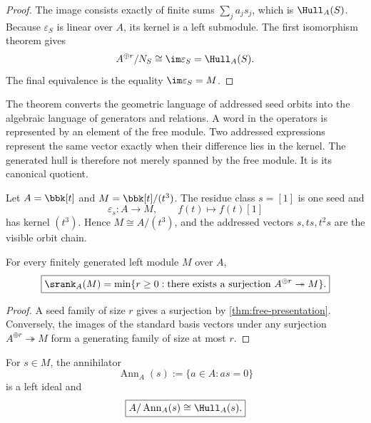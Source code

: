 \begin{proof}
The image consists exactly of finite sums $\sum_ja_js_j$, which is $\Hull_A(S)$.  Because $\varepsilon_S$ is linear over $A$, its kernel is a left submodule.  The first isomorphism theorem gives
\[
A^{\oplus r}/N_S\cong\im\varepsilon_S=\Hull_A(S).
\]
The final equivalence is the equality $\im\varepsilon_S=M$.
\end{proof}

\begin{interpretation}
The theorem converts the geometric language of addressed seed orbits into the algebraic language of generators and relations.  A word in the operators is represented by an element of the free module.  Two addressed expressions represent the same vector exactly when their difference lies in the kernel.  The generated hull is therefore not merely spanned by the free module.  It is its canonical quotient.
\end{interpretation}

\begin{microexample}[title={A cyclic nilpotent chain}]
Let \(A=\bbk[t]\) and \(M=\bbk[t]/(t^3)\).  The residue class \(s=[1]\) is one seed and
\[
\varepsilon_s:A\to M,
\qquad
f(t)\mapsto f(t)[1]
\]
has kernel \((t^3)\).  Hence \(M\cong A/(t^3)\), and the addressed vectors \(s,ts,t^2s\) are the visible orbit chain.
\end{microexample}


\begin{corollary}
\label{cor:minimal-free-cover}
For every finitely generated left module $M$ over $A$,
\[
\boxed{
\srank_A(M)=\min\{r\geq0:\text{there exists a surjection }A^{\oplus r}\twoheadrightarrow M\}.
}
\]
\end{corollary}

\begin{proof}
A seed family of size $r$ gives a surjection by \cref{thm:free-presentation}.  Conversely, the images of the standard basis vectors under any surjection $A^{\oplus r}\twoheadrightarrow M$ form a generating family of size at most $r$.
\end{proof}

\begin{corollary}
\label{cor:one-seed-presentation}
For $s\in M$, the annihilator
\[
\operatorname{Ann}_A(s):=\{a\in A:as=0\}
\]
is a left ideal and
\[
\boxed{A/\operatorname{Ann}_A(s)\cong\Hull_A(s).}
\]
\end{corollary}

